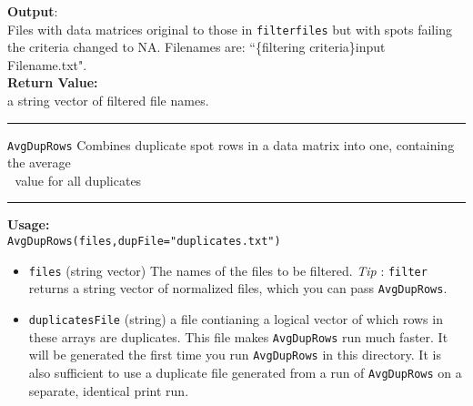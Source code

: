 \documentclass[10pt]{article}
\newcommand{\fquote}{``}
\begin{document}
\textbf{Output}:\\ Files with data matrices original to those in \texttt{filterfiles} but with spots failing the criteria changed to NA. Filenames are: \fquote \{filtering criteria\}\textunderscore input Filename.txt".\\
  \textbf{Return Value:}\\ a string vector of filtered file names.\\
  \rule{\linewidth}{0.4pt}
    \texttt{AvgDupRows} \hspace{1in} Combines duplicate spot rows in a data matrix into one, containing the average \\ \textcolor{white}{.} \hspace{1.7in}value for all duplicates\\
      \rule{\linewidth}{0.4pt}
\textbf{Usage:}\\
\texttt{AvgDupRows(files,dupFile="duplicates.txt")}
\begin{itemize}
     	\item \texttt{files} (string vector) The names of the files to be filtered. 
     	\emph{Tip} : \texttt{filter} returns a string vector of normalized files, which you can pass \texttt{AvgDupRows}.
     	\item \texttt{duplicatesFile} (string) a file contianing a logical vector of which rows in these arrays are duplicates. This file makes \texttt{AvgDupRows} run much faster. It will be generated the first time you run \texttt{AvgDupRows} in this directory. It is also sufficient to use a duplicate file generated from a run of \texttt{AvgDupRows} on a separate, identical print run.    	     	     	     	     	     	     	     	     	     	     	
   
\end{itemize}
\end{document}
